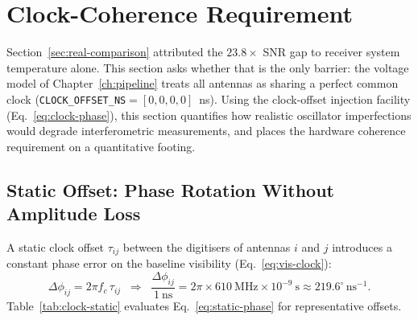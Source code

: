 \section{Clock-Coherence Requirement}
\label{sec:clock-offset}

Section~\ref{sec:real-comparison} attributed the $23.8\times$ SNR gap to receiver
system temperature alone. This section asks whether that is the only barrier: the
voltage model of Chapter~\ref{ch:pipeline} treats all antennas as sharing a perfect
common clock (\texttt{CLOCK\_OFFSET\_NS}$=[0,0,0,0]$~ns). Using the clock-offset
injection facility (Eq.~\eqref{eq:clock-phase}), this section quantifies how
realistic oscillator imperfections would degrade interferometric measurements, and
places the hardware coherence requirement on a quantitative footing.

\subsection{Static Offset: Phase Rotation Without Amplitude Loss}

A static clock offset $\tau_{ij}$ between the digitisers of antennas $i$ and $j$
introduces a constant phase error on the baseline visibility
(Eq.~\eqref{eq:vis-clock}):
\begin{equation}
  \Delta\phi_{ij} = 2\pi f_c\,\tau_{ij}
  \;\;\Longrightarrow\;\;
  \frac{\Delta\phi_{ij}}{1~\mathrm{ns}}
    = 2\pi\times\SI{610}{\mega\hertz}\times10^{-9}~\mathrm{s}
    \approx 219.6^\circ\,\mathrm{ns}^{-1}.
  \label{eq:static-phase}
\end{equation}
Table~\ref{tab:clock-static} evaluates Eq.~\eqref{eq:static-phase} for
representative offsets.

